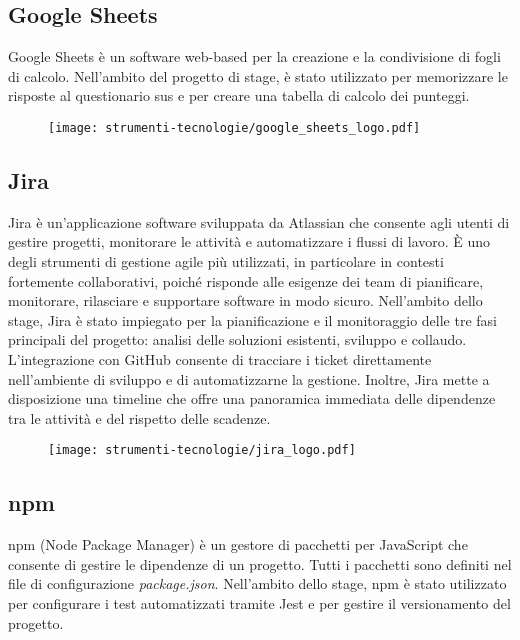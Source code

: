 \subsection*{Google Sheets}

\par Google Sheets è un software web-based per la creazione e la condivisione di fogli di calcolo. Nell’ambito del progetto di stage, è stato utilizzato per memorizzare le risposte al questionario \gls{sus} e per creare una tabella di calcolo dei punteggi.

\begin{figure}[H]
    \centering 
    \texttt{[image: strumenti-tecnologie/google\_sheets\_logo.pdf]} 
\end{figure}

\subsection*{Jira}

\par Jira è un'applicazione software sviluppata da Atlassian che consente agli utenti di gestire progetti, monitorare le attività e automatizzare i flussi di lavoro. È uno degli strumenti di gestione agile più utilizzati, in particolare in contesti fortemente collaborativi, poiché risponde alle esigenze dei team di pianificare, monitorare, rilasciare e supportare software in modo sicuro. Nell’ambito dello stage, Jira è stato impiegato per la pianificazione e il monitoraggio delle tre fasi principali del progetto: analisi delle soluzioni esistenti, sviluppo e collaudo. L’integrazione con GitHub consente di tracciare i ticket direttamente nell’ambiente di sviluppo e di automatizzarne la gestione. Inoltre, Jira mette a disposizione una timeline che offre una panoramica immediata delle dipendenze tra le attività e del rispetto delle scadenze.

\begin{figure}[H]
    \centering 
    \texttt{[image: strumenti-tecnologie/jira\_logo.pdf]} 
\end{figure}

\subsection*{npm}

\par npm (Node Package Manager) è un gestore di pacchetti per JavaScript che consente di gestire le dipendenze di un progetto. Tutti i pacchetti sono definiti nel file di configurazione \textit{package.json}. Nell’ambito dello stage, npm è stato utilizzato per configurare i test automatizzati tramite Jest e per gestire il versionamento del progetto.

